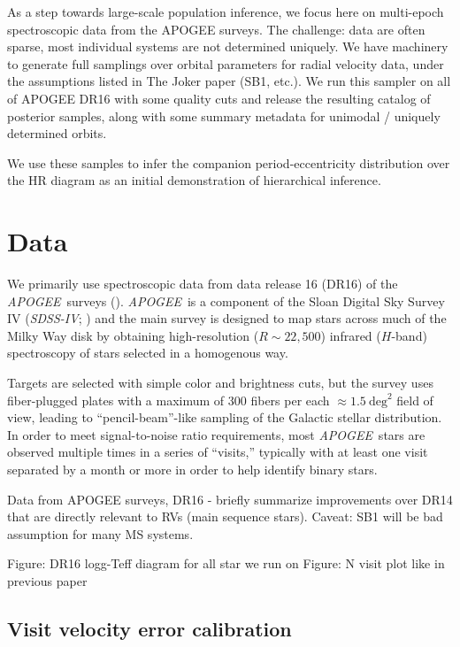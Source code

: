 \documentclass[modern]{aastex62}
\newcommand{\project}[1]{\textsl{#1}}
\newcommand{\acronym}[1]{{\small{#1}}}
\newcommand{\DR}{\acronym{DR}16}
\newcommand{\apogee}{\project{\acronym{APOGEE}}}
\newcommand{\sdssiv}{\project{\acronym{SDSS-IV}}}
\begin{document}
As a step towards large-scale population inference, we focus here on multi-epoch spectroscopic data from the APOGEE surveys.
The challenge: data are often sparse, most individual systems are not determined uniquely.
We have machinery to generate full samplings over orbital parameters for radial velocity data, under the assumptions listed in The Joker paper (SB1, etc.).
We run this sampler on all of APOGEE DR16 with some quality cuts and release the resulting catalog of posterior samples, along with some summary metadata for unimodal / uniquely determined orbits.

We use these samples to infer the companion period-eccentricity distribution over the HR diagram as an initial demonstration of hierarchical inference.

\section{Data} \label{sec:data}

We primarily use spectroscopic data from data release 16 (\DR) of the \apogee\ surveys (\citealt{Majewski:2017, Abolfathi:2017, XXXX:2019}).
\apogee\ is a component of the Sloan Digital Sky Survey IV (\sdssiv; \citealt{Gunn:2006, Blanton:2017}) and the main survey is designed to map stars across much of the Milky Way disk by obtaining high-resolution ($R \sim 22,500$) infrared ($H$-band) spectroscopy of stars selected in a homogenous way.

Targets are selected with simple color and brightness cuts, but the survey uses
fiber-plugged plates with a maximum of 300 fibers per each $\approx
1.5~\textrm{deg}^2$ field of view, leading to ``pencil-beam''-like sampling of
the Galactic stellar distribution.
In order to meet signal-to-noise ratio requirements, most \apogee\ stars are
observed multiple times in a series of ``visits,'' typically with at least one
visit separated by a month or more in order to help identify binary stars.



Data from APOGEE surveys, DR16 - briefly summarize improvements over DR14 that are directly relevant to RVs (main sequence stars). Caveat: SB1 will be bad assumption for many MS systems.

Figure: DR16 logg-Teff diagram for all star we run on
Figure: N visit plot like in previous paper

\subsection{Visit velocity error calibration} \label{sec:visitcalib}
\end{document}

